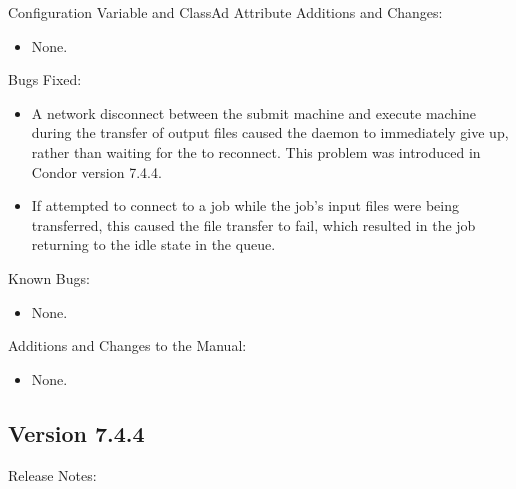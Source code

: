 \noindent Configuration Variable and ClassAd Attribute Additions and Changes:

\begin{itemize}

\item None.

\end{itemize}

\noindent Bugs Fixed:

\begin{itemize}

\item A network disconnect between the submit machine and execute
  machine during the transfer of output files caused the
   daemon to immediately give up, rather than waiting
  for the  to reconnect.  This problem was introduced
  in Condor version 7.4.4.

\item If  attempted to connect to a job while the
  job's input files were being transferred, this caused the file
  transfer to fail, which resulted in the job returning to the idle
  state in the queue.

\end{itemize}

\noindent Known Bugs:

\begin{itemize}

\item None.

\end{itemize}

\noindent Additions and Changes to the Manual:

\begin{itemize}

\item None.

\end{itemize}


\subsection*{\label{sec:New-7-4-4}Version 7.4.4}

\noindent Release Notes:

